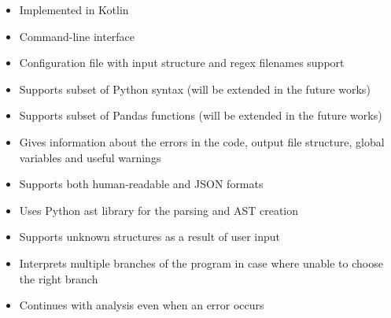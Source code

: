 \large
\begin{itemize}
    \item Implemented in Kotlin
    \item Command-line interface
    \item Configuration file with input structure and regex filenames support
    \item Supports subset of Python syntax (will be extended in the future works)
    \item Supports subset of Pandas functions (will be extended in the future works)
    \item Gives information about the errors in the code, output file structure, global variables and useful warnings
    \item Supports both human-readable and JSON formats
    \item Uses Python ast library for the parsing and AST creation
    \item Supports unknown structures as a result of user input
    \item Interprets multiple branches of the program in case where unable to choose the right branch
    \item Continues with analysis even when an error occurs
\end{itemize}
